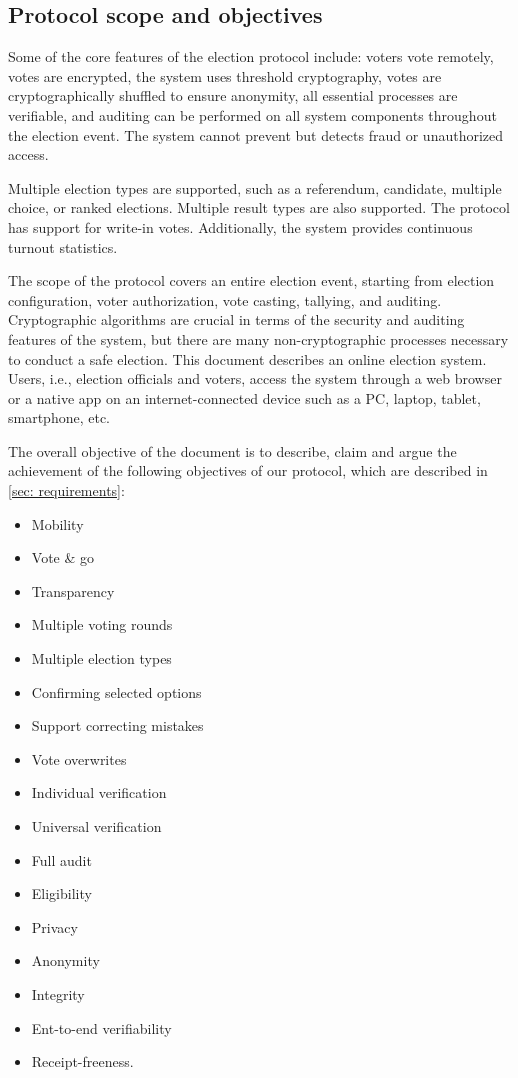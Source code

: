 \subsection{Protocol scope and objectives}
Some of the core features of the election protocol include: voters vote remotely, votes are encrypted, the system uses threshold cryptography, votes are cryptographically shuffled to ensure anonymity, all essential processes are verifiable, and auditing can be performed on all system components throughout the election event. The system cannot prevent but detects fraud or unauthorized access.

Multiple election types are supported, such as a referendum, candidate, multiple choice, or ranked elections. Multiple result types are also supported. The protocol has support for write-in votes. Additionally, the system provides continuous turnout statistics.

The scope of the protocol covers an entire election event, starting from election configuration, voter authorization, vote casting, tallying, and auditing. Cryptographic algorithms are crucial in terms of the security and auditing features of the system, but there are many non-cryptographic processes necessary to conduct a safe election. This document describes an online election system. Users, i.e., election officials and voters, access the system through a web browser or a native app on an internet-connected device such as a PC, laptop, tablet, smartphone, etc.

The overall objective of the document is to describe, claim and argue the achievement of the following objectives of our protocol, which are described in \cref{sec: requirements}:
\begin{multicols}{2}
\begin{itemize}
    \item Mobility
    \item Vote \& go
    \item Transparency
    \item Multiple voting rounds
    \item Multiple election types
    \item Confirming selected options
    \item Support correcting mistakes
    \item Vote overwrites
    \item Individual verification
    \item Universal verification    
    \item Full audit
    \item Eligibility
    \item Privacy
    \item Anonymity
    \item Integrity
    \item Ent-to-end verifiability
    \item Receipt-freeness.
\end{itemize}
\end{multicols}

